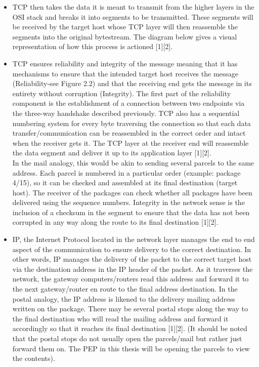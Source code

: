 \documentclass{uathesis}
\begin{document}
\begin{itemize}
\item TCP then takes the data it is meant to transmit from the higher layers in the OSI stack and breaks it into segments to be transmitted. These segments will be received by the target host whose TCP layer will then reassemble the segments into the original bytestream. The diagram below gives a visual representation of how this process is actioned [1][2].  \\

\item TCP ensures reliability and integrity of the message meaning that it has mechanisms to ensure that the intended target host receives the message (Reliability-see Figure 2.2) and that the receiving end gets the message in its entirety without corruption (Integrity). The first part of the reliability component is the establishment of a connection between two endpoints via the three-way handshake described previously. TCP also has a sequential numbering system for every byte traversing the connection so that each data transfer/communication can be reassembled in the correct order and intact when the receiver gets it. The TCP layer at the receiver end will reassemble the data segment and deliver it up to its application layer [1][2].\\

In the mail analogy, this would be akin to sending several parcels to the same address. Each parcel is numbered in a particular order (example: package 4/15), so it can be checked and assembled at its final destination (target host). The receiver of the packages can check whether all packages have been delivered using the sequence numbers. Integrity in the network sense is the inclusion of a checksum in the segment to ensure that the data has not been corrupted in any way along the route to its final destination [1][2].  \\

\item IP, the Internet Protocol located in the network layer manages the end to end aspect of the communication to ensure delivery to the correct destination. In other words, IP manages the delivery of the packet to the correct target host via the destination address in the IP header of the packet. As it traverses the network, the gateway computers/routers read this address and forward it to the next gateway/router en route to the final address destination. In the postal analogy, the IP address is likened to the delivery mailing address written on the package. There may be several postal stops along the way to the final destination who will read the mailing address and forward it accordingly so that it reaches its final destination [1][2]. (It should be noted that the postal stops do not usually open the parcels/mail but rather just forward them on. The PEP in this thesis will be opening the parcels to view the contents). \\



\end{itemize}
\end{document}
